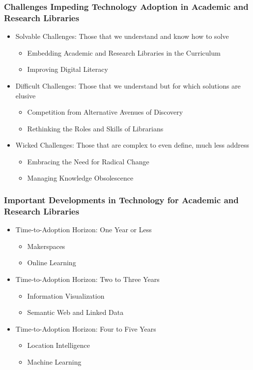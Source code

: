  \begin{frame}
    \frametitle{Challenges Impeding Technology Adoption in Academic and Research Libraries}
      \begin{itemize}
        \item Solvable Challenges: Those that we understand and know how to solve
          \begin{itemize}
            \item Embedding Academic and Research Libraries in the Curriculum
            \item Improving Digital Literacy
          \end{itemize}
        \item Difficult Challenges: Those that we understand but for which solutions are elusive
          \begin{itemize}
            \item Competition from Alternative Avenues of Discovery
            \item Rethinking the Roles and Skills of Librarians
          \end{itemize}
        \item Wicked Challenges: Those that are complex to even define, much less address
          \begin{itemize}
            \item Embracing the Need for Radical Change
            \item Managing Knowledge Obsolescence
          \end{itemize}
      \end{itemize}
  \end{frame}

  \begin{frame}    
    \frametitle{Important Developments in Technology for Academic and Research Libraries}
      \begin{itemize}
        \item Time-to-Adoption Horizon: One Year or Less
          \begin{itemize}
            \item Makerspaces
            \item Online Learning
          \end{itemize}
        \item Time-to-Adoption Horizon: Two to Three Years
          \begin{itemize}
            \item Information Visualization
            \item Semantic Web and Linked Data
          \end{itemize}
        \item Time-to-Adoption Horizon: Four to Five Years
          \begin{itemize}
            \item Location Intelligence
            \item Machine Learning
          \end{itemize}
      \end{itemize}
  \end{frame}

